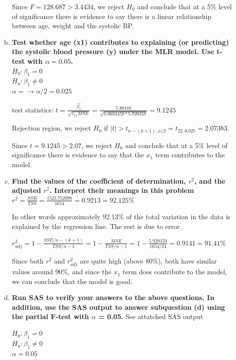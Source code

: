 \documentclass{article}
\begin{document}
\begin{enumerate}[1.]
\begin{enumerate}[(a)]
Since $F = 128.687 > 3.4434$, we reject $H_0$ and conclude that at a 5\% level of significance there is evidence to say there is a linear relationship between age, weight and the systolic BP.

\item \textbf{ Test whether age (x1) contributes to explaining (or predicting) the systolic blood pressure (y) under the MLR model. Use t-test with $\alpha = 0.05$. } \\

$H_0: \beta_1 = 0$ \\
$H_a: \beta_1 \neq 0$ \\
$\alpha = \to \alpha/2 =  0.025$

test statistics: $t = \frac{\hat{\beta_1}}{\sqrt{v_{11}MSE}} = \frac{5.80416}{\sqrt{0.0683459 * 5.920359}} = 9.1245$

Rejection region, we reject $H_0$ if $|t| > t_{n-(k+1), \alpha/2} = t_{22, 0.025} =  2.07383$.

Since $t =  9.1245 > 2.07$, we reject $H_0$ and conclude that at a 5\% level of significance there is evidence to say that the $x_1$ term contributes to the model.

\item \textbf{ Find the values of the coefficient of determination, $r^2$, and the adjusted $r^2$. Interpret their meanings in this problem} \\

$r^2 = \frac{SSR}{TSS} = \frac{1523.752098}{1654} = 0.9213 = 92.125\%$

In other words approximately 92.13\% of the total variation in the data is explained by the regression line. The rest is due to error.

$r_{adj}^2 = 1 - \frac{SSE/n-(k+1)}{TSS/n-1} = 1 - \frac{MSE}{TSS/n-1} = 1 - \frac{5.920359}{1654/24} = 0.9141 = 91.41\%$

Since both $r^2$ and $r_{adj}^2$ are quite high (above 80\%), both have similar values around 90\%, and since the $x_1$ term does contribute to the model, we can conclude that the model is good.

\item \textbf{ Run SAS to verify your answers to the above questions. In addition, use the SAS output to answer subquestion (d) using the partial F-test with $\alpha$ = 0.05.} See attatched SAS output

$H_0: \beta_1 = 0$ \\
$H_a: \beta_1 \neq 0$ \\
$\alpha = 0.05$ \\


\end{enumerate}
\end{enumerate}
\end{document}
